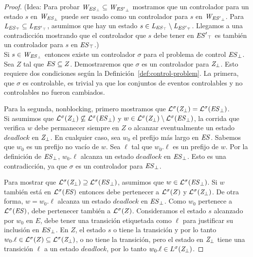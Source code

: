 \begin{proof}
	
(Idea:	Para probar $\mathit{W_{\mathit{{\mathit{ES}}_{\bot}}}} \subseteq \mathit{W_{\mathit{{\mathit{ES}'}_{\bot}}}}$ mostramos que un controlador para un estado $s$ en $\mathit{W_{\mathit{{\mathit{ES}}_{\bot}}}}$ 
	puede ser usado como un controlador para $s$ en $\mathit{W_{\mathit{{\mathit{ES}'}_{\bot}}}}$. Para $\mathit{L_{\mathit{{\mathit{ES}}_{\top}}}} \subseteq 
	\mathit{L_{\mathit{{\mathit{ES}'}_{\top}}}}$, asumimos que hay un estado $s \in \mathit{L_{\mathit{{\mathit{ES}}_{\top}}}} \setminus \mathit{L_{\mathit{{\mathit{ES}'}_{\top}}}} $. Llegamos a una contradicción mostrando que el controlador que $s$ debe tener en
	$\mathit{{\mathit{ES}'}_{\top}}$ es también un controlador para $s$ en $\mathit{{\mathit{ES}}_{\top}}$.)\\
	

Si $s \in \mathit{W_{\mathit{{\mathit{ES}}_{\bot}}}} $ entonces existe un controlador $\sigma$ para el problema de control $\mathit{{\mathit{ES}}_{\bot}}$. Sea $Z$ tal que $\mathit{ES} \subseteq Z$. Demostraremos que $\sigma$ es un controlador para $\mathit{{Z}_{\bot}}$. Esto requiere dos condiciones según la Definición~\ref{def:control-problem}. La primera, que $\sigma$ es controlable, es trivial ya que los conjuntos de eventos controlables y no controlables no fueron cambiados. 

Para la segunda, nonblocking, primero mostramos que $\mathcal{L}^\sigma(\mathit{{Z}_{\bot}}) = 
\mathcal{L}^\sigma(\mathit{{\mathit{ES}}_{\bot}})$. \\

Si asumimos que $\mathcal{L}^\sigma(\mathit{{Z}_{\bot}}) \not\subseteq \mathcal{L}^\sigma(\mathit{{\mathit{ES}}_{\bot}})$ y $w \in 
\mathcal{L}^\sigma(\mathit{{Z}_{\bot}}) \setminus \mathcal{L}^\sigma(\mathit{{\mathit{ES}}_{\bot}})$, la corrida que verifica $w$ debe permanecer siempre en $Z$ o alcanzar eventualmente un estado $deadlock$ en $\mathit{{Z}_{\bot}}$. En cualquier caso, sea $w_0$ el prefijo más largo en $\mathit{ES}$. 
Sabemos que $w_0$ es un prefijo no vacío de $w$. Sea $\ell$ tal que $w_0.\ell$ es un prefijo de $w$. 
Por la definición de $\mathit{{\mathit{ES}}_{\bot}}$, $w_0.\ell$ alcanza un estado $deadlock$ en $\mathit{{\mathit{ES}}_{\bot}}$. Esto es una contradicción, ya que $\sigma$ es un controlador para
$\mathit{{\mathit{ES}}_{\bot}}$. 

Para mostrar que $\mathcal{L}^\sigma(\mathit{{Z}_{\bot}}) \supseteq \mathcal{L}^\sigma(\mathit{{\mathit{ES}}_{\bot}})$, asumimos que $w \in \mathcal{L}^\sigma(\mathit{{\mathit{ES}}_{\bot}})$. Si $w$ también está en $\mathcal{L}^\sigma(\mathit{ES})$ entonces debe pertenecer a $\mathcal{L}^\sigma(Z)$ y $\mathcal{L}^\sigma(\mathit{{Z}_{\bot}})$. De otra forma, $w = w_0.\ell$ alcanza un estado $deadlock$ en $\mathit{{\mathit{ES}}_{\bot}}$. Como $w_0$ pertenece a $\mathcal{L}^\sigma(\mathit{ES})$, debe pertenecer también a $\mathcal{L}^\sigma(Z)$. Consideramos el estado $s$ alcanzado por  $w_0$ en $E$, debe tener una transición etiquetada como $\ell$ para justificar su inclusión en $\mathit{{\mathit{ES}}_{\bot}}$. En $Z$, el estado $s$ o tiene la transición y por lo tanto $w_0.\ell \in \mathcal{L}^\sigma(Z) \subseteq 
\mathcal{L}^\sigma(\mathit{{Z}_{\bot}})$, o no tiene la transición, pero el estado en $\mathit{{Z}_{\bot}}$ tiene una transición $\ell$ a un estado $deadlock$, por lo tanto $w_0.\ell \in 
L^\sigma(\mathit{{Z}_{\bot}})$.


\end{proof}
